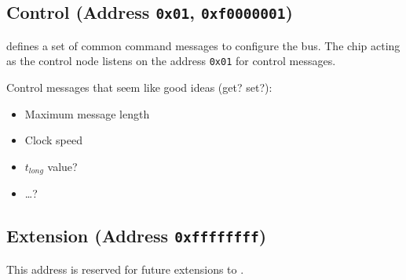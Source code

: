\subsection{Control (Address \texttt{0x01}, \texttt{0xf0000001})}
\label{sec:control-control}
\bus defines a set of common command messages to configure the bus. The chip
acting as the control node listens on the address {\tt 0x01} for \bus control
messages.

Control messages that seem like good ideas (get? set?):
\begin{itemize}
  \item Maximum message length
  \item Clock speed
  \item $t_{long}$ value?
  \item \ldots?
\end{itemize}

\subsection{Extension (Address \texttt{0xffffffff})}
This address is reserved for future extensions to \bus.

